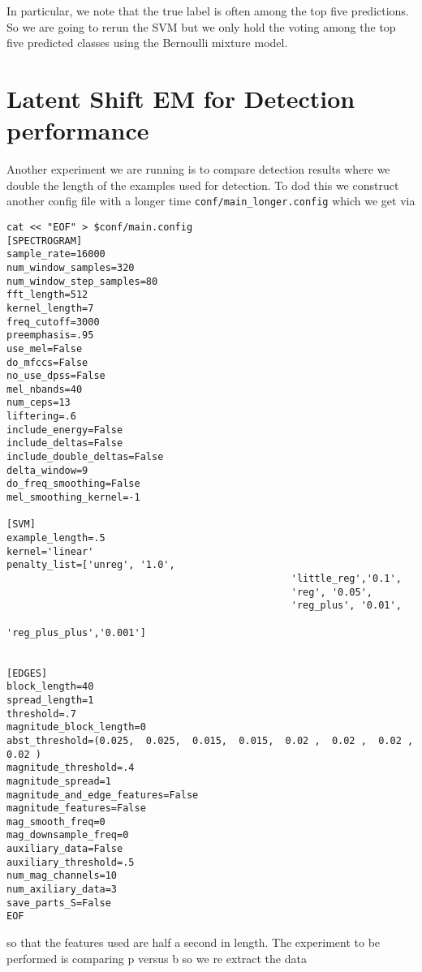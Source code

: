 \documentclass{article}
\begin{document}
\begin{verbatim}

\end{verbatim}

  In particular, we note that the true label
is often among the top five predictions.  So we are going to
rerun the SVM but we only hold the voting among the top five
predicted classes using the Bernoulli mixture model.



\section{Latent Shift EM for Detection performance}
Another experiment we are running is to compare detection results where we double the length of the examples used for detection.
To dod this we construct another config file with a longer time
\texttt{conf/main\_longer.config}
which we get via
\begin{verbatim}
cat << "EOF" > $conf/main.config
[SPECTROGRAM]
sample_rate=16000
num_window_samples=320
num_window_step_samples=80
fft_length=512
kernel_length=7
freq_cutoff=3000
preemphasis=.95
use_mel=False
do_mfccs=False
no_use_dpss=False
mel_nbands=40
num_ceps=13
liftering=.6
include_energy=False
include_deltas=False
include_double_deltas=False
delta_window=9
do_freq_smoothing=False
mel_smoothing_kernel=-1

[SVM]
example_length=.5
kernel='linear'
penalty_list=['unreg', '1.0',
                                                 'little_reg','0.1',
                                                 'reg', '0.05',
                                                 'reg_plus', '0.01',
                                                 'reg_plus_plus','0.001']


[EDGES]
block_length=40
spread_length=1
threshold=.7
magnitude_block_length=0
abst_threshold=(0.025,  0.025,  0.015,  0.015,  0.02 ,  0.02 ,  0.02 ,  0.02 )
magnitude_threshold=.4
magnitude_spread=1
magnitude_and_edge_features=False
magnitude_features=False
mag_smooth_freq=0
mag_downsample_freq=0
auxiliary_data=False
auxiliary_threshold=.5
num_mag_channels=10
num_axiliary_data=3
save_parts_S=False
EOF

\end{verbatim}
so that the features used are half a second in length. The experiment
to be performed is comparing p versus b so we re extract the
data
\end{document}

